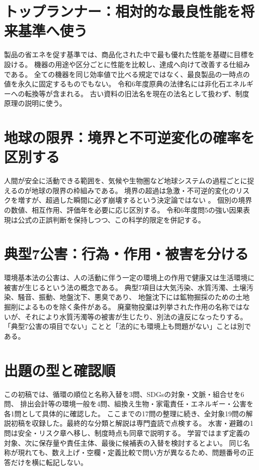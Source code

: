 \section{トップランナー：相対的な最良性能を将来基準へ使う}
\label{theory:environment:toprunner}
製品の省エネを促す基準では、商品化された中で最も優れた性能を基礎に目標を設ける。
機器の用途や区分ごとに性能を比較し、達成へ向けて改善する仕組みである\cite{env_toprunner2019}。
全ての機器を同じ効率値で比べる規定ではなく、最良製品の一時点の値を永久に固定するものでもない。
令和6年度原典の法律名には非化石エネルギーへの転換等が含まれる。
古い資料の旧法名を現在の法名として扱わず、制度原理の説明に使う。

\section{地球の限界：境界と不可逆変化の確率を区別する}
\label{theory:environment:planetary}
人間が安全に活動できる範囲を、気候や生物圏など地球システムの過程ごとに捉えるのが地球の限界の枠組みである。
境界の超過は急激・不可逆的変化のリスクを増すが、超過した瞬間に必ず崩壊するという決定論ではない
\cite{env_planetary}。
個別の境界の数値、相互作用、評価年を必要に応じ区別する。
令和6年度問5の強い因果表現は公式の正誤判断を保持しつつ、この科学的限定を併記する。

\section{典型7公害：行為・作用・被害を分ける}
\label{theory:environment:pollution}
環境基本法の公害は、人の活動に伴う一定の環境上の作用で健康又は生活環境に被害が生じるという法の概念である。
典型7項目は大気汚染、水質汚濁、土壌汚染、騒音、振動、地盤沈下、悪臭であり、
地盤沈下には鉱物掘採のための土地掘削によるものを除く条件がある\cite{env_pollution}。
廃棄物投棄は列挙された作用の名称ではないが、それにより水質汚濁等の被害が生じたり、別法の違反になったりする。
「典型7公害の項目でない」ことと「法的にも環境上も問題がない」ことは別である。

\section{出題の型と確認順}
この初稿では、循環の順位と名称入替を3問、SDGsの対象・文脈・組合せを6問、
排出会計等の環境一般を4問、組換え生物・家電責任・エネルギー・公害を各1問として具体的に確認した。
ここまでの17問の整理に続き、全対象19問の解説初稿を収録した。最終的な分類と解説は専門査読で点検する。
水害・避難の1問は安全・リスク章へ移し、制度時点も同章で説明する。
学習ではまず定義の対象、次に保存量や責任主体、最後に候補表の入替を検討するとよい。
同じ名称が現れても、数え上げ・空欄・定義比較で問い方が異なるため、問題番号の正答だけを横に転記しない。



